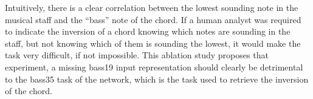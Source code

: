 
Intuitively, there is a clear correlation between the lowest
sounding note in the musical staff and the ``bass'' note of
the chord. If a human analyst was required to indicate the
inversion of a chord knowing which notes are sounding in the
staff, but not knowing which of them is sounding the lowest,
it would make the task very difficult, if not impossible.
This ablation study proposes that experiment, a missing
\gls{bass19} input representation should clearly be
detrimental to the \gls{bass35} task of the network, which
is the task used to retrieve the inversion of the chord.
